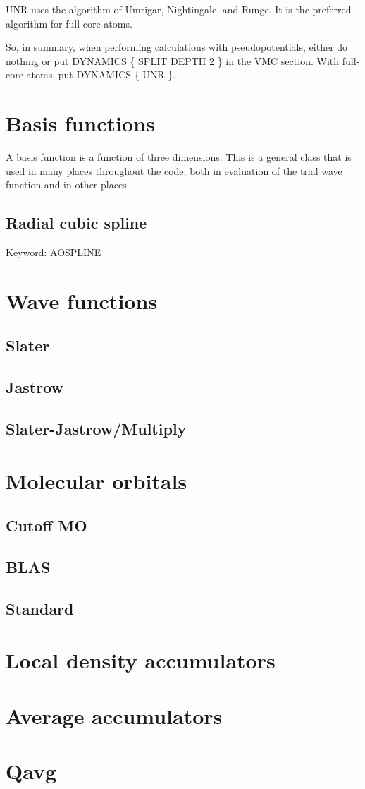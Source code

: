 \documentclass[12pt]{article}
\begin{document}
UNR uses the algorithm of Umrigar, Nightingale, and Runge.  It is the preferred 
algorithm for full-core atoms.

So, in summary, when performing calculations with pseudopotentials, either do nothing 
or put DYNAMICS \{ SPLIT DEPTH 2 \} in the VMC section.  With full-core atoms, put 
DYNAMICS \{ UNR \}.

\newpage

\section{Basis functions}

A basis function is a function of three dimensions.  This is a general 
class that is used in many places throughout the code; both in evaluation of the 
trial wave function and in other places.

\subsection{Radial cubic spline}

Keyword: AOSPLINE \\



\newpage

\section{Wave functions}
\subsection{Slater}
\subsection{Jastrow}
\subsection{Slater-Jastrow/Multiply}

\section{Molecular orbitals}
\subsection{Cutoff MO}
\subsection{BLAS} 
\subsection{Standard}

\section{Local density accumulators}

\section{Average accumulators}

\section{Qavg}
\end{document}

